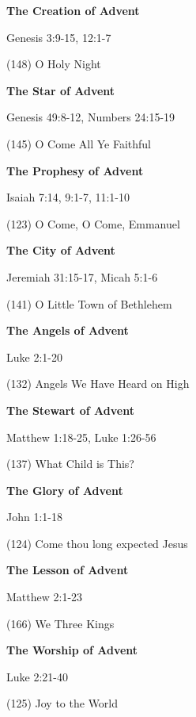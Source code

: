 \documentclass{article}
\begin{document}
\begin{center}
\textbf{}
\vspace{.1in}

{}
\end{center}
\vspace{.3in}









\thispagestyle{empty}


{\Large


\noindent\textbf{The Creation of Advent}


Genesis 3:9-15, 12:1-7


(148) O Holy Night
\vspace{.1in}

\noindent\textbf{The Star of Advent}

Genesis 49:8-12, Numbers 24:15-19


(145) O Come All Ye Faithful
\vspace{.1in}


\noindent\textbf{The Prophesy of Advent}

Isaiah 7:14, 9:1-7, 11:1-10

(123) O Come, O Come, Emmanuel
\vspace{.1in}

\noindent\textbf{The City of Advent}

Jeremiah 31:15-17, Micah 5:1-6

(141) O Little Town of Bethlehem
\vspace{.1in}

\noindent\textbf{The Angels of Advent}

Luke 2:1-20

(132) Angels We Have Heard on High
\vspace{.1in}

\noindent\textbf{The Stewart of Advent}

Matthew 1:18-25, Luke 1:26-56

(137) What Child is This?
\vspace{.1in}


\noindent\textbf{The Glory of Advent}

John 1:1-18

(124) Come thou long expected Jesus
\vspace{.1in}

\noindent\textbf{The Lesson of Advent}

Matthew 2:1-23

(166) We Three Kings
\vspace{.1in}

\noindent\textbf{The Worship of Advent}

Luke 2:21-40

(125) Joy to the World

}
\end{document}
